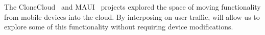 The CloneCloud~\cite{chun:clonecloud} and MAUI~\cite{cuervo:maui} projects explored the space of moving functionality 
from mobile devices into the cloud. By interposing on user traffic, \meddle will allow us to explore some of this 
functionality without requiring device modifications.


